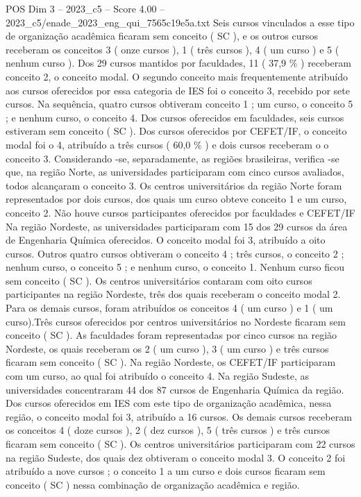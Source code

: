\begin{textsample}{POS Dim 3 – 2023\_c5 – Score 4.00 – 2023\_c5/enade\_2023\_eng\_qui\_7565c19e5a.txt}
Seis cursos vinculados a esse tipo de organização acadêmica ficaram sem conceito ( SC ), e os outros cursos receberam os conceitos 3 ( onze cursos ), 1 ( três cursos ), 4 ( um curso ) e 5 ( nenhum curso ).
Dos 29 cursos mantidos por faculdades, 11 ( 37,9 \% ) receberam conceito 2, o conceito modal.
O segundo conceito mais frequentemente atribuído aos cursos oferecidos por essa categoria de IES foi o conceito 3, recebido por sete cursos.
Na sequência, quatro cursos obtiveram conceito 1 ; um curso, o conceito 5 ; e nenhum curso, o conceito 4.
Dos cursos oferecidos em faculdades, seis cursos estiveram sem conceito ( SC ).
Dos cursos oferecidos por CEFET/IF, o conceito modal foi o 4, atribuído a três cursos ( 60,0 \% ) e dois cursos receberam o o conceito 3.
Considerando -se, separadamente, as regiões brasileiras, verifica -se que, na região Norte, as universidades participaram com cinco cursos avaliados, todos alcançaram o conceito 3.
Os centros universitários da região Norte foram representados por dois cursos, dos quais um curso obteve conceito 1 e um curso, conceito 2.
Não houve cursos participantes oferecidos por faculdades e CEFET/IF Na região Nordeste, as universidades participaram com 15 dos 29 cursos da área de Engenharia Química oferecidos.
O conceito modal foi 3, atribuído a oito cursos.
Outros quatro cursos obtiveram o conceito 4 ; três cursos, o conceito 2 ; nenhum curso, o conceito 5 ; e nenhum curso, o conceito 1.
Nenhum curso ficou sem conceito ( SC ).
Os centros universitários contaram com oito cursos participantes na região Nordeste, três dos quais receberam o conceito modal 2.
Para os demais cursos, foram atribuídos os conceitos 4 ( um curso ) e 1 ( um curso).Três cursos oferecidos por centros universitários no Nordeste ficaram sem conceito ( SC ).
As faculdades foram representadas por cinco cursos na região Nordeste, os quais receberam os 2 ( um curso ), 3 ( um curso ) e três cursos ficaram sem conceito ( SC ).
Na região Nordeste, os CEFET/IF participaram com um curso, ao qual foi atribuído o conceito 4.
Na região Sudeste, as universidades concentraram 44 dos 87 cursos de Engenharia Química da região.
Dos cursos oferecidos em IES com este tipo de organização acadêmica, nessa região, o conceito modal foi 3, atribuído a 16 cursos.
Os demais cursos receberam os conceitos 4 ( doze cursos ), 2 ( dez cursos ), 5 ( três cursos ) e três cursos ficaram sem conceito ( SC ).
Os centros universitários participaram com 22 cursos na região Sudeste, dos quais dez obtiveram o conceito modal 3.
O conceito 2 foi atribuído a nove cursos ; o conceito 1 a um curso e dois cursos ficaram sem conceito ( SC ) nessa combinação de organização acadêmica e região.

\end{textsample}
